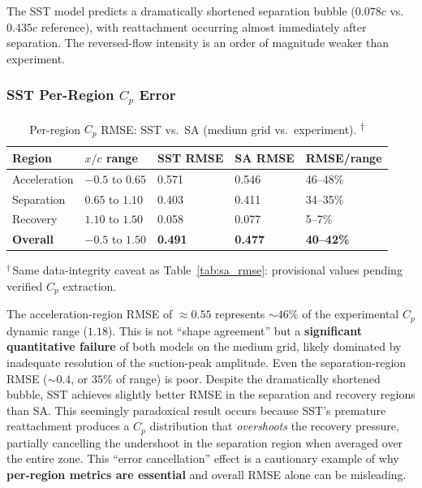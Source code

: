 \documentclass[11pt,a4paper]{article}
\begin{document}
The SST model predicts a dramatically shortened separation bubble
($0.078c$ vs.\ $0.435c$ reference), with reattachment occurring almost
immediately after separation.  The reversed-flow intensity is an order
of magnitude weaker than experiment.

\subsubsection{SST Per-Region $C_p$ Error}

\begin{table}[!ht]
\centering
\caption{Per-region $C_p$ RMSE: SST vs.\ SA (medium grid vs.\ experiment).%
  \textsuperscript{$\dagger$}}
\label{tab:sst_rmse}
\begin{tabular}{lllll}
\toprule
\textbf{Region} & \textbf{$x/c$ range} & \textbf{SST RMSE} & \textbf{SA RMSE}
  & \textbf{RMSE/range} \\
\midrule
Acceleration & $-0.5$ to $0.65$ & 0.571 & 0.546 & 46--48\% \\
Separation   & $0.65$ to $1.10$ & 0.403 & 0.411 & 34--35\% \\
Recovery     & $1.10$ to $1.50$ & 0.058 & 0.077 & 5--7\% \\
\textbf{Overall} & $-0.5$ to $1.50$ & \textbf{0.491} & \textbf{0.477}
  & \textbf{40--42\%} \\
\bottomrule
\end{tabular}

\medskip\footnotesize $^\dagger$\,Same data-integrity caveat as
Table~\ref{tab:sa_rmse}: provisional values pending verified $C_p$ extraction.
\end{table}

\noindent The acceleration-region RMSE of $\approx 0.55$ represents
$\sim\!46\%$ of the experimental $C_p$ dynamic range ($1.18$).  This is
not ``shape agreement'' but a \textbf{significant quantitative failure}
of both models on the medium grid, likely dominated by inadequate
resolution of the suction-peak amplitude. Even the separation-region
RMSE ($\sim\!0.4$, or $35\%$ of range) is poor.
Despite the dramatically shortened bubble, SST achieves slightly better
RMSE in the separation and recovery regions than SA.  This seemingly
paradoxical result occurs because SST's premature reattachment produces a
$C_p$ distribution that \emph{overshoots} the recovery pressure, partially
cancelling the undershoot in the separation region when averaged over the
entire zone.  This ``error cancellation'' effect is a cautionary example
of why \textbf{per-region metrics are essential} and overall RMSE alone can
be misleading.
\end{document}
